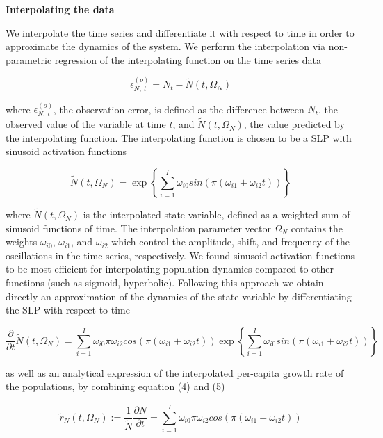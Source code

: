 \documentclass[11pt, oneside]{article}
\begin{document}
\textbf{Interpolating the data}

We interpolate the time series and differentiate it with respect to time in order to approximate the dynamics of the system.
We perform the interpolation via non-parametric regression of the interpolating function on the time series data

\begin{equation}
    \epsilon^{(o)}_{N,~t} = N_t - \tilde{N}(t,\Omega_N)
\end{equation}

where $\epsilon^{(o)}_{N,~t}$, the observation error, is defined as the difference between $N_t$, the observed value of the variable at time $t$, and $\tilde{N}(t,\Omega_N)$, the value predicted by the interpolating function. 
The interpolating function is chosen to be a SLP with sinusoid activation functions

\begin{equation}
    \tilde{N}(t,\Omega_N) = \exp \left \{ \sum_{i=1}^{I} \omega_{i0} sin \left(\pi (\omega_{i1} + \omega_{i2} t) \right) \right \}
\end{equation}

where $\tilde{N}(t,\Omega_N)$ is the interpolated state variable, defined as a weighted sum of sinusoid functions of time.
The interpolation parameter vector $\Omega_N$ contains the weights $\omega_{i0}$, $\omega_{i1}$, and $\omega_{i2}$ which control the amplitude, shift, and frequency of the oscillations in the time series, respectively.
We found sinusoid activation functions to be most efficient for interpolating population dynamics compared to other functions (such as sigmoid, hyperbolic).
Following this approach we obtain directly an approximation of the dynamics of the state variable by differentiating the SLP with respect to time

\begin{equation}
	\frac{\partial}{\partial t} \tilde{N}(t, \Omega_N) = \sum_{i=1}^{I} \omega_{i0} \pi \omega_{i2} cos \left(\pi (\omega_{i1} + \omega_{i2} t) \right) \exp \left \{ \sum_{i=1}^{I} \omega_{i0} sin \left(\pi (\omega_{i1} + \omega_{i2} t) \right) \right \}
\end{equation}

as well as an analytical expression of the interpolated per-capita growth rate of the populations, by combining equation (4) and (5)

\begin{equation}
    \tilde{r}_N (t,\Omega_N) := \frac{1}{\tilde{N}} \frac{\partial \tilde{N}}{\partial t} = \sum_{i=1}^{I} \omega_{i0} \pi \omega_{i2} cos \left(\pi (\omega_{i1} + \omega_{i2} t) \right)
\end{equation}
\end{document}
